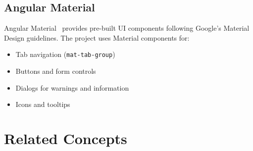 \subsection{Angular Material}

Angular Material~\cite{MaterialDesign} provides pre-built UI components following Google's Material Design guidelines. The project uses Material components for:
\begin{itemize}
    \item Tab navigation (\texttt{mat-tab-group})
    \item Buttons and form controls
    \item Dialogs for warnings and information
    \item Icons and tooltips
\end{itemize}

\section{Related Concepts}
\label{sec:related-concepts}



